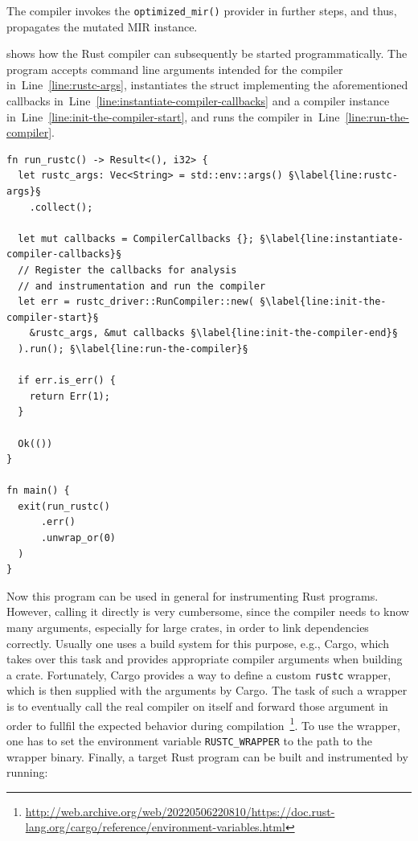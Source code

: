 \documentclass[paper=a4,%
  twoside,%
  BCOR4mm,%
  abstract=true,%
  toc=bibliography,%
  chapterprefix=true,%
  toc=bibliographynumbered,%
  open=right,%
  english,%
  pagesize=pdftex]{scrreprt}
\newcommand{\mir}{\ac{MIR}\xspace}
\begin{document}
The compiler invokes the \texttt{optimized\string_mir()} provider in further steps, and thus, propagates the mutated \mir instance.

 shows how the Rust compiler can subsequently be started programmatically. The program accepts command line arguments intended for the compiler in~Line~\ref{line:rustc-args}, instantiates the struct implementing the aforementioned callbacks in~Line~\ref{line:instantiate-compiler-callbacks} and a compiler instance in~Line~\ref{line:init-the-compiler-start}, and runs the compiler in~Line~\ref{line:run-the-compiler}.

\begin{lstlisting}[style=boxed, caption={Running the Rust compiler like a library}, label=lst:running-compiler, escapechar=§]
fn run_rustc() -> Result<(), i32> {
  let rustc_args: Vec<String> = std::env::args() §\label{line:rustc-args}§
    .collect();

  let mut callbacks = CompilerCallbacks {}; §\label{line:instantiate-compiler-callbacks}§
  // Register the callbacks for analysis 
  // and instrumentation and run the compiler
  let err = rustc_driver::RunCompiler::new( §\label{line:init-the-compiler-start}§
    &rustc_args, &mut callbacks §\label{line:init-the-compiler-end}§
  ).run(); §\label{line:run-the-compiler}§

  if err.is_err() {
    return Err(1);
  }

  Ok(())
}

fn main() {
  exit(run_rustc()
      .err()
      .unwrap_or(0)
  )
}
\end{lstlisting}

Now this program can be used in general for instrumenting Rust programs. However, calling it directly is very cumbersome, since the compiler needs to know many arguments, especially for large crates, in order to link dependencies correctly. Usually one uses a build system for this purpose, e.g., Cargo, which takes over this task and provides appropriate compiler arguments when building a crate. Fortunately, Cargo provides a way to define a custom \texttt{rustc} wrapper, which is then supplied with the arguments by Cargo. The task of such a wrapper is to eventually call the real compiler on itself and forward those argument in order to fullfil the expected behavior during compilation~\footnote{\url{http://web.archive.org/web/20220506220810/https://doc.rust-lang.org/cargo/reference/environment-variables.html}}. To use the wrapper, one has to set the environment variable \texttt{RUSTC\string_WRAPPER} to the path to the wrapper binary. Finally, a target Rust program can be built and instrumented by running:
\end{document}
